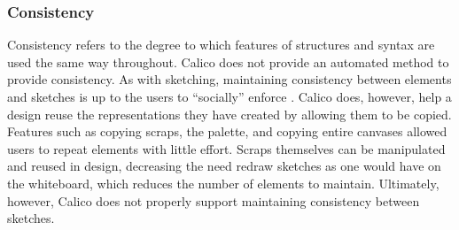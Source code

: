 \documentclass[12pt,fleqn]{ucithesis}
\begin{document}
\subsubsection{Consistency}
Consistency refers to the degree to which features of structures and syntax are used the same way throughout. Calico does not provide an automated method to provide consistency. As with sketching, maintaining consistency between elements and sketches is up to the users to ``socially'' enforce \cite{Petre2013BookChapter}. Calico does, however, help a design reuse the representations they have created by allowing them to be copied. Features such as copying scraps, the palette, and copying entire canvases allowed users to repeat elements with little effort. Scraps themselves can be manipulated and reused in design, decreasing the need redraw sketches as one would have on the whiteboard, which reduces the number of elements to maintain. Ultimately, however, Calico does not properly support maintaining consistency between sketches.


\end{document}
